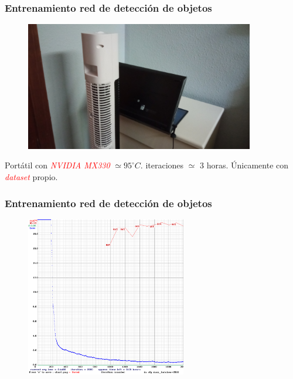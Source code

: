 \documentclass{beamer}
\begin{document}
\begin{frame}
	\frametitle{Entrenamiento red de detección de objetos}
	\begin{figure}
		\centering
		\includegraphics[width=10cm]{figs/fan}
	\end{figure}
	\begin{outline}
		\1 Portátil con \textcolor{red}{\textit{NVIDIA MX330}} $\simeq 95^\circ C$.
		 iteraciones $\simeq$ 3 horas.
		\1 Únicamente con \textcolor{red}{\textit{dataset}} propio.
	\end{outline}
\end{frame}

\begin{frame}
	\frametitle{Entrenamiento red de detección de objetos}
	\begin{figure}
		\centering
		\includegraphics[width=7cm]{figs/chart}
	\end{figure}
\end{frame}
\end{document}
